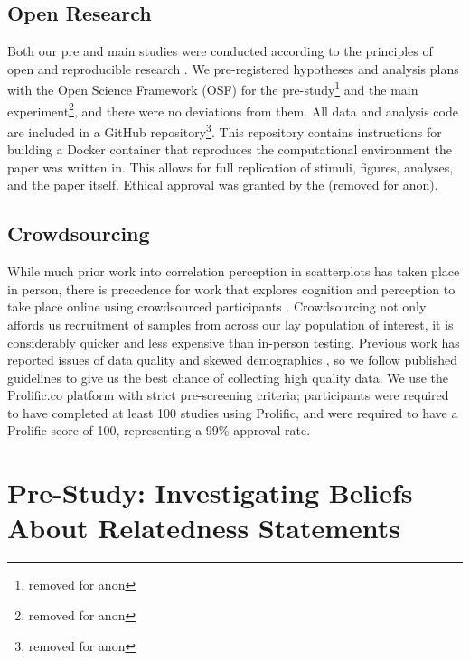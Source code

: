 \documentclass[manuscript,screen,review,anonymous]{acmart}
\begin{document}
\subsection{Open Research}\label{sec-open-research}

Both our pre and main studies were conducted according to the principles
of open and reproducible research \citep{ayris_2018}. We pre-registered
hypotheses and analysis plans with the Open Science Framework (OSF) for
the pre-study\footnote{removed for anon} and the main
experiment\footnote{removed for anon}, and there were no deviations from
them. All data and analysis code are included in a GitHub
repository\footnote{removed for anon}. This repository contains
instructions for building a Docker container \citep{merkel_2014} that
reproduces the computational environment the paper was written in. This
allows for full replication of stimuli, figures, analyses, and the paper
itself. Ethical approval was granted by the (removed for anon).

\subsection{Crowdsourcing}\label{sec-crowdsourcing}

While much prior work into correlation perception in scatterplots has
taken place in person, there is precedence for work that explores
cognition and perception to take place online using crowdsourced
participants \citep{xiong_2022}. Crowdsourcing not only affords us
recruitment of samples from across our lay population of interest, it is
considerably quicker and less expensive than in-person testing. Previous
work has reported issues of data quality and skewed demographics
\citep{chmielewski_2020, charalambides_2021, peer_2021}, so we follow
published guidelines \citep{peer_2021} to give us the best chance of
collecting high quality data. We use the Prolific.co platform
\citep{prolific} with strict pre-screening criteria; participants were
required to have completed at least 100 studies using Prolific, and were
required to have a Prolific score of 100, representing a 99\% approval
rate.

\section{Pre-Study: Investigating Beliefs About Relatedness
Statements}\label{sec-pre-study}
\end{document}
